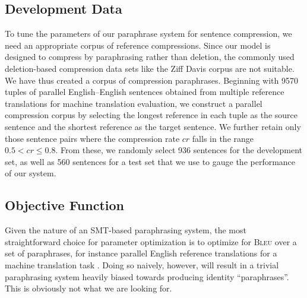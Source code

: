 \documentclass[11pt]{article}
\begin{document}
\subsection{Development Data}
\label{dev-data}
To tune the parameters of our paraphrase system for sentence
compression, we need an appropriate corpus of reference
compressions. Since our model is designed to compress by paraphrasing
rather than deletion, the commonly used deletion-based compression
data sets like the Ziff Davis corpus are not suitable. We have
thus created a corpus of compression paraphrases. Beginning with 9570
tuples of parallel English--English sentences obtained from multiple
reference translations for machine translation evaluation, we
construct a parallel compression corpus by selecting the longest
reference in each tuple as the source sentence and the shortest
reference as the target sentence. We further retain only those
sentence pairs where the compression rate $\mathit{cr}$ falls in the range $0.5 <
\mathit{cr} \leq 0.8$. From these, we randomly select 936
sentences for the development set, as well as 560 sentences for a test
set that we use to gauge the performance of our system.


\subsection{Objective Function}
\label{objective-fn}

Given the nature of an SMT-based paraphrasing system, the most
straightforward choice for parameter optimization is to optimize for
\textsc{Bleu} over a set of paraphrases, for instance parallel English
reference translations for a machine translation task
\cite{Madnani2007}. Doing so naively, however, will result in a
trivial paraphrasing system heavily biased towards producing identity
``paraphrases''. This is obviously not what we are looking for.

\end{document}
